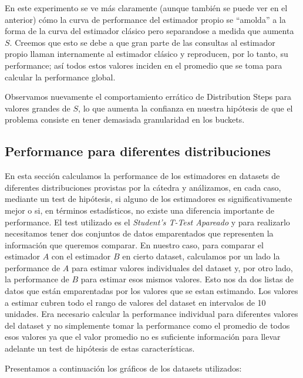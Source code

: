 En este experimento se ve más claramente (aunque también se puede ver en el anterior) cómo la curva de performance del estimador propio se ``amolda'' a la forma de la curva del estimador clásico pero separandose a medida que aumenta $S$. Creemos que esto se debe a que gran parte de las consultas al estimador propio llaman internamente al estimador clásico y reproducen, por lo tanto, su performance; así todos estos valores inciden en el promedio que se toma para calcular la performance global.

Observamos nuevamente el comportamiento errático de Distribution Steps para valores grandes de $S$, lo que aumenta la confianza en nuestra hipótesis de que el problema consiste en tener demasiada granularidad en los buckets.

\subsection{Performance para diferentes distribuciones}
En esta sección calculamos la performance de los estimadores en datasets de diferentes distribuciones provistas por la cátedra y análizamos, en cada caso, mediante un test de hipótesis, si alguno de los estimadores es significativamente mejor o si, en términos estadísticos, no existe una diferencia importante de performance. 
El test utilizado es el \textit{Student’s T-Test Apareado} y para realizarlo necesitamos tener dos conjuntos de datos emparentados que representen la información que queremos comparar. En nuestro caso, para comparar el estimador $A$ con el estimador $B$ en cierto dataset, calculamos por un lado la performance de $A$ para estimar valores individuales del dataset y, por otro lado, la performance de $B$ para estimar esos mismos valores. Esto nos da dos listas de datos que están emparentadas por los valores que se estan estimando. Los valores a estimar cubren todo el rango de valores del dataset en intervalos de 10 unidades. Era necesario calcular la performance individual para diferentes valores del dataset y no simplemente tomar la performance como el promedio de todos esos valores ya que el valor promedio no es suficiente información para llevar adelante un test de hipótesis de estas características.

Presentamos a continuación los gráficos de los datasets utilizados:


